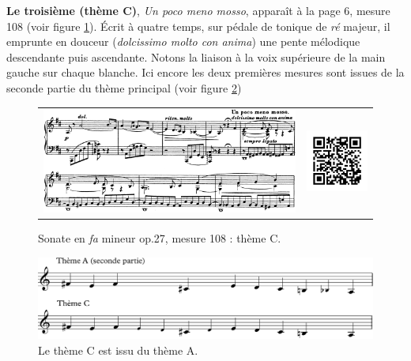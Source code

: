 \textbf{Le troisième (thème C)}, \emph{Un poco meno mosso}, apparaît à la page 6, mesure 108 (voir figure \ref{sonate-theme-3}). Écrit à quatre temps, sur pédale de tonique de \emph{ré} majeur, il emprunte en douceur (\emph{dolcissimo molto con anima}) une pente mélodique descendante puis ascendante. Notons la liaison à la voix supérieure de la main gauche sur chaque blanche. Ici encore les deux premières mesures sont issues de la seconde partie du thème principal (voir figure \ref{sonate-theme-1-vs-3})

\begin{figure}[!ht]
  \begin{bigcenter}
    \begin{tabular}{lr}
      \includegraphics[width=12.5cm, keepaspectratio]{sonate-theme-C.png}
      &
      \includegraphics[width=3cm, keepaspectratio]{op1-qr.png}
    \end{tabular}
  \end{bigcenter}
  \caption{\label{sonate-theme-3}Sonate en \emph{fa} mineur op.27, mesure 108 : thème C.}
\end{figure}

\begin{figure}[!ht]
  \begin{bigcenter}
      \includegraphics[width=12.75cm, keepaspectratio]{sonate-theme-A-vs-C.pdf}\vspace{-0.5cm}
  \end{bigcenter}
  \caption{\label{sonate-theme-1-vs-3}Le thème C est issu du thème A.}
\end{figure}

